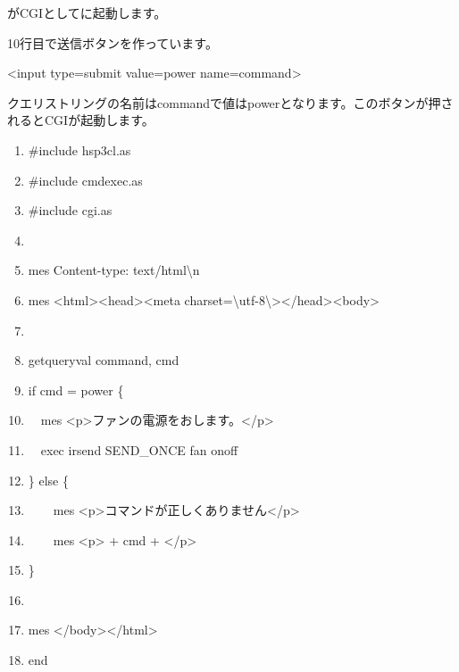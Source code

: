 がCGIとしてに起動します。

10行目で送信ボタンを作っています。

{\textless}input type={\textquotedbl}submit{\textquotedbl} value={\textquotedbl}power{\textquotedbl}
name={\textquotedbl}command{\textquotedbl}{\textgreater}

クエリストリングの名前はcommandで値はpowerとなります。このボタンが押されるとCGIが起動します。

\centering
\begin{boxedminipage}{16.36cm}
	\begin{enumerate}
	\baselineskip 10pt
	\setlength{\itemsep}{0cm}
	\item\#include {\textquotedbl}hsp3cl.as{\textquotedbl}
	\item\#include {\textquotedbl}cmdexec.as{\textquotedbl}
	\item\#include {\textquotedbl}cgi.as{\textquotedbl}
	\item
	\item mes {\textquotedbl}Content-type: text/html{\textbackslash}n{\textquotedbl}
	\item mes {\textquotedbl}{\textless}html{\textgreater}{\textless}head{\textgreater}{\textless}meta
	 charset={\textbackslash}{\textquotedbl}utf-8{\textbackslash}{\textquotedbl}{\textgreater}{\textless}/head{\textgreater}{\textless}body{\textgreater}{\textquotedbl}
	\item
	\item getqueryval {\textquotedbl}command{\textquotedbl}, cmd
	\item if cmd = {\textquotedbl}power{\textquotedbl} \{
	\item\ \ mes
		{\textquotedbl}{\textless}p{\textgreater}ファンの電源をおします。{\textless}/p{\textgreater}{\textquotedbl}
	\item\ \ exec {\textquotedbl}irsend SEND\_ONCE fan onoff{\textquotedbl}
	\item\} else \{
	\item\ \ \ \ mes
		{\textquotedbl}{\textless}p{\textgreater}コマンドが正しくありません{\textless}/p{\textgreater}{\textquotedbl}
	\item\ \ \ \ mes {\textquotedbl}{\textless}p{\textgreater}{\textquotedbl} + cmd +
	{\textquotedbl}{\textless}/p{\textgreater}{\textquotedbl}
	\item\}
	\item
	\item mes {\textquotedbl}{\textless}/body{\textgreater}{\textless}/html{\textgreater}{\textquotedbl}
	\item end
	\end{enumerate}
\end{boxedminipage}
\flushleft

